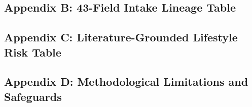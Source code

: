 \documentclass[11pt,a4paper]{article}
\begin{document}
\subsection*{Appendix B: 43-Field Intake Lineage Table}


\subsection*{Appendix C: Literature-Grounded Lifestyle Risk Table}


\subsection*{Appendix D: Methodological Limitations and Safeguards}

\end{document}
